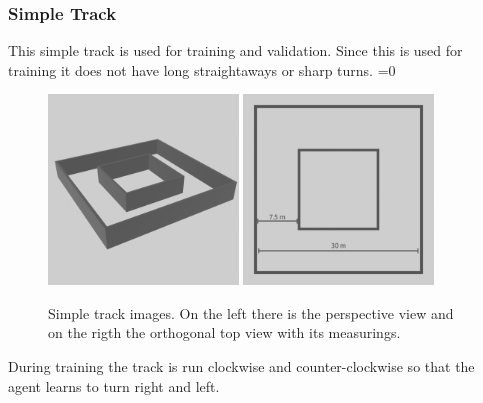 \documentclass[14pt]{extarticle}
\newcounter{debug}
\begin{document}
\begin{flushleft}
	\subsubsection{Simple Track}
	This simple track is used for training and validation. Since this is used for training it does not have long straightaways or sharp turns.
	\ifnum\value{debug}=0 {
	\begin{figure}[H]
    		\centering\includegraphics[width=0.45\textwidth]{./Image/Environment/Easy/perspective.png}
    		\centering\includegraphics[width=0.45\textwidth]{./Image/Environment/Easy/top_mod.png}
		\vspace{5mm}
		\caption{Simple track images. On the left there is the perspective view and on the rigth the orthogonal top view with its measurings.}
	\end{figure}
	}\fi
	During training the track is run clockwise and counter-clockwise so that the agent learns to turn right and left.
	

\end{flushleft}
\end{document}
